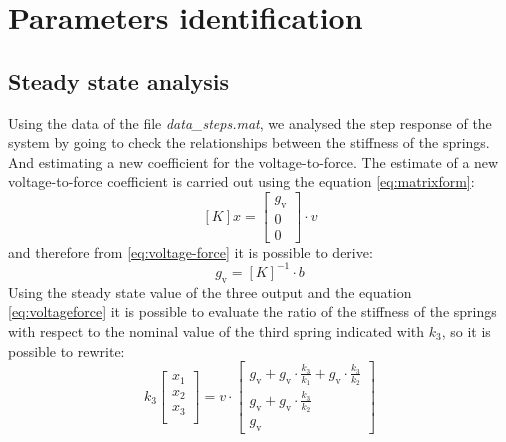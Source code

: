 \chapter{Parameters identification}
\label{chap:paramidentification}
\section{Steady state analysis}
\label{sec:steadystate}
Using the data of the file \emph{data\_steps.mat}, we analysed the step response
of the system by going to check the relationships between the stiffness of the 
springs. 
And estimating a new coefficient for the voltage-to-force.
The estimate of a new voltage-to-force coefficient is carried out using the 
equation \eqref{eq:matrixform}:
\begin{equation} 
\label{eq:voltage-force}
	[K] x = \begin{bmatrix}
 			g_{\text{v}}	\\
 			0 	\\
 			0
 		\end{bmatrix} \cdot v
\end{equation}
and therefore from \eqref{eq:voltage-force} it is possible to derive:
\begin{equation} \label{eq:voltageforce}
	g_{\text{v}} = [K]^{-1} \cdot b
\end{equation}
Using the steady state value of the three output and the equation 
\eqref{eq:voltageforce} it is possible to evaluate the ratio of the stiffness 
of the springs with respect to  the nominal value of the third spring indicated 
with $k_3$, so it is possible to rewrite:
\begin{equation}
	\label{eq:gvestimate}
	k_3 \begin{bmatrix}
		x_1\\
		x_2\\
		x_3\\
	\end{bmatrix} = v \cdot
	\begin{bmatrix}
		g_{\text{v}} + g_{\text{v}} \cdot \frac{k_3}{k_1} + g_{\text{v}} \cdot 
		\frac{k_{3}}{k_{2}}\\
    		g_{\text{v}} + g_{\text{v}} \cdot \frac{k_{3}}{k_{2}}\\
    		g_{\text{v}}
    \end{bmatrix}
\end{equation}
